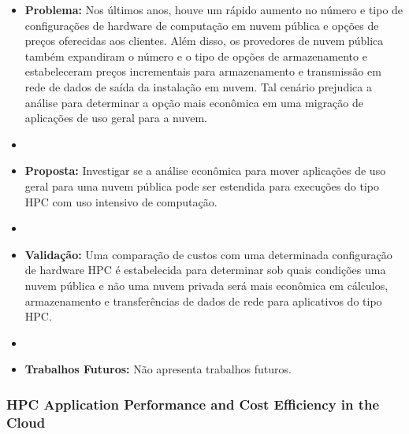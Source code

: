 \documentclass[tese,capa]{texufpel}
\begin{document}
\begin{itemize}[label={},noitemsep]
  \item \textbf{Problema:} Nos últimos anos, houve um rápido aumento no número e tipo de configurações de hardware de computação em nuvem pública e opções de preços oferecidas aos clientes. Além disso, os provedores de nuvem pública também expandiram o número e o tipo de opções de armazenamento e estabeleceram preços incrementais para armazenamento e transmissão em rede de dados de saída da instalação em nuvem. Tal cenário prejudica a análise para determinar a opção mais econômica em uma migração de aplicações de uso geral para a nuvem.
  \item 
  \item \textbf{Proposta:} Investigar se a análise econômica para mover aplicações de uso geral para uma nuvem pública pode ser estendida para execuções do tipo HPC com uso intensivo de computação.
  \item 
  \item \textbf{Validação:} Uma comparação de custos com uma determinada configuração de hardware HPC é estabelecida para determinar sob quais condições uma nuvem pública e não uma nuvem privada será mais econômica em cálculos, armazenamento e transferências de dados de rede para aplicativos do tipo HPC.
  \item 
  \item \textbf{Trabalhos Futuros:} Não apresenta trabalhos futuros. 
\end{itemize}

\subsubsection{HPC Application Performance and Cost Efficiency in the Cloud \cite{roloffHPCApplicationPerformance2017c}}
\end{document}
